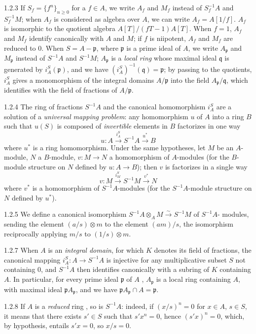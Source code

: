 \begin{env}{1.2.3}
\label{0.1.2.3}
If $S_f=\{f^n\}_{n\geq 0}$ for a $f\in A$, we write $A_f$ and $M_f$ instead of $S_f^{-1}A$ and $S_f^{-1}M$; when $A_f$ is
considered as algebra over $A$, we can write $A_f=A[1/f]$. $A_f$ is isomorphic to the quotient algebra $A[T]/(fT-1)A[T]$.
When $f=1$, $A_f$ and $M_f$ identify canonically with $A$ and $M$; if $f$ is niipotent, $A_f$ and $M_f$ are reduced to $0$.
When $S=A-\mathfrak{p}$, where $\mathfrak{p}$ is a prime ideal of $A$, we write $A_\mathfrak{p}$ and $M_\mathfrak{p}$ instead of $S^{-1}A$ and $S^{-1}M$;
$A_\mathfrak{p}$ is a \emph{local ring} whose maximal ideal $\mathfrak{q}$ is generated by $i_A^S(\mathfrak{p})$, and we have
$(i_A^S)^{-1}(\mathfrak{q})=\mathfrak{p}$; by passing to the quotients, $i_A^S$ gives a monomorphism of the integral domains $A/\mathfrak{p}$ into the
field $A_\mathfrak{p}/\mathfrak{q}$, which identifies with the field of fractions of $A/\mathfrak{p}$.
\end{env}

\begin{env}{1.2.4}
The ring of fractions $S^{-1}A$ and the canonical homomorphism $i_A^S$ are a solution of a \emph{universal mapping problem}:
any homomorphism $u$ of $A$ into a ring $B$ such that $u(S)$ is composed of \emph{invertible} elements in $B$ factorizes in
one way
\[
  u\colon A\xrightarrow{i_A^S}S^{-1}A\xrightarrow{u^\ast}B
\]
where $u^\ast$ is a ring homomorphism. Under the same hypotheses, let $M$ be an
$A$-module, $N$ a $B$-module, $v\colon M\to N$ a homomorphism of $A$-modules (for the
$B$-module structure on $N$ defined by $u\colon A\to B$); then $v$ is factorizes in a single
way
\[
  v\colon M\xrightarrow{i_M^S}S^{-1}M\xrightarrow{v^\ast}N
\]
where $v^\ast$ is a homomorphism of $S^{-1}A$-modules (for the $S^{-1}A$-module structure 
on $N$ defined by $u^\ast$).
\end{env}

\begin{env}{1.2.5}
We define a canonical isomorphism $S^{-1}A\otimes_A M\xrightarrow{\sim}S^{-1}M$ of $S^{-1}A$-
modules, sending the element $(a/s)\otimes m$ to the element $(am)/s$, the isomorphism
reciprocally applying $m/s$ to $(1/s)\otimes m$.
\end{env}

\begin{env}{1.2.7}
When $A$ is an \emph{integral domain}, for which $K$ denotes its field of fractions, the canonical mapping $i_A^S\colon A\to S^{-1}A$
is injective for any multiplicative subset $S$ not containing $0$, and $S^{-1}A$ then identifies canonically with a subring of $K$
containing $A$. In particular, for every prime ideal $\mathfrak{p}$ of $A$ , $A_\mathfrak{p}$ is a local ring containing $A$,
with maximal ideal $\mathfrak{p}A_\mathfrak{p}$, and we have $\mathfrak{p}A_\mathfrak{p}\cap A=\mathfrak{p}$.
\end{env}

\begin{env}{1.2.8}
If $A$ is a \emph{reduced} ring , so is $S^{-1}A$: indeed, if $(x/s)^n=0$ for $x\in A$, $s\in S$, it means that
there exists $s'\in S$ such that $s'x^n=0$, hence $(s'x)^n=0$, which, by hypothesis, entails $s'x=0$, so $x/s=0$.
\end{env}

